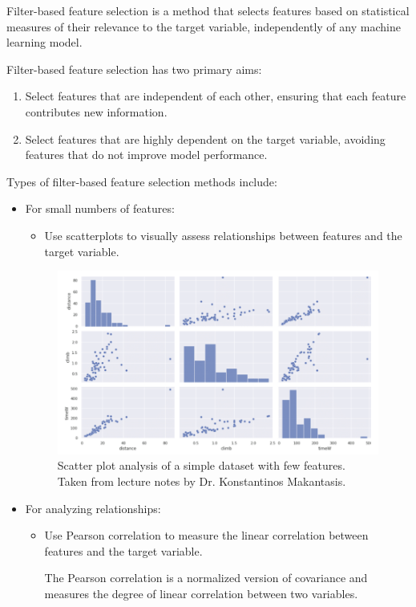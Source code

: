 	
	Filter-based feature selection is a method that selects features based on statistical measures of their relevance to the target variable, independently of any machine learning model.
	
	Filter-based feature selection has two primary aims:
	\begin{enumerate}
		\item Select features that are independent of each other, ensuring that each feature contributes new information.
		\item Select features that are highly dependent on the target variable, avoiding features that do not improve model performance.
	\end{enumerate}
	
	Types of filter-based feature selection methods include:
	\begin{itemize}
		\item For small numbers of features:
		\begin{itemize}
			\item Use scatterplots to visually assess relationships between features and the target variable.
		\end{itemize}
		
		\begin{figure}[H]
			\centering
			\includegraphics[width=0.7\linewidth]{img/img-scatter-plot}
			\caption{Scatter plot analysis of a simple dataset with few features. Taken from lecture notes by Dr. Konstantinos Makantasis.}
			\label{fig:img-scatter-plot}
		\end{figure}
		
		
		\item For analyzing relationships:
		\begin{itemize}
			\item Use Pearson correlation to measure the linear correlation between features and the target variable.
			
		The Pearson correlation is a normalized version of covariance\cite{penny2008mathematics} and measures the degree of linear correlation between two variables.
			

\end{itemize}
\end{itemize}
